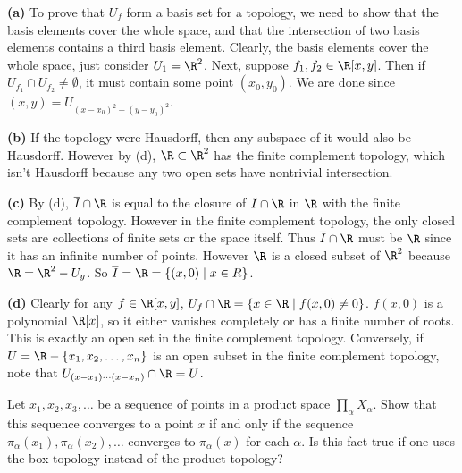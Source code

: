 \documentclass[11pt,letterpaper]{article}
\begin{document}
\begin{solution}
    \textbf{(a)} To prove that $U_f$ form a basis set for a topology, we need to show that the basis elements cover the whole space, and that the intersection of two basis elements contains a third basis element.  Clearly, the basis elements cover the whole space, just consider $U_1=\R^2$. Next, suppose $f_1, f_2\in \R[x,y]$. Then if $U_{f_1}\cap U_{f_2}\neq \emptyset$, it must contain some point $(x_0,y_0)$. We are done since $(x,y)=U_{(x-x_0)^2+(y-y_0)^2}$. 
    
    \textbf{(b)} If the topology were Hausdorff, then any subspace of it would also be Hausdorff. However by (d), $\R\subset \R^2$ has the finite complement topology, which isn't Hausdorff because any two open sets have nontrivial intersection. 
    
    \textbf{(c)} By (d), $\overline{I}\cap \R$ is equal to the closure of $I\cap \R$ in $\R$ with the finite complement topology. However in the finite complement topology, the only closed sets are collections of finite sets or the space itself. Thus $\overline{I}\cap \R$ must be $\R$ since it has an infinite number of points. However $\R$ is a closed subset of $\R^2$ because $\R = \R^2-U_y$. So $\overline{I}=\R=\{(x,0)\mid x\in R\}$.      
    
    \textbf{(d)} Clearly for any $f\in \R[x,y]$, $U_f\cap \R=\{x\in \R\mid f(x,0)\neq 0\}$. $f(x,0)$ is a polynomial $\R[x]$, so it either vanishes completely or has a finite number of roots. This is exactly an open set in the finite complement topology. Conversely, if $U=\R-\{x_1, x_2,\ldots,x_n\}$ is an open subset in the finite complement topology, note that $U_{(x-x_1)\cdots (x-x_n)}\cap \R = U$.     
\end{solution}

\begin{problem}
    Let $x_1, x_2, x_3, \ldots$ be a sequence of points in a product space $\prod_\alpha X_\alpha$. Show that this sequence converges to a point $x$ if and only if the sequence $\pi_\alpha(x_1), \pi_\alpha(x_2), \ldots$ converges to $\pi_\alpha(x)$ for each $\alpha$. Is this fact true if one uses the box topology instead of the product topology? 
\end{problem}
\end{document}
